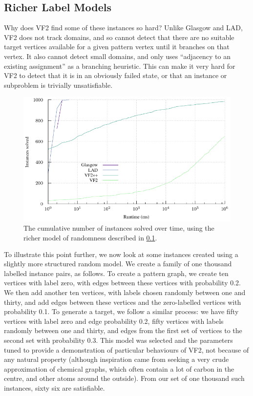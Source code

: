 \documentclass[twoside,11pt]{article}
\begin{document}
\subsection{Richer Label Models}\label{subsection:richer-labels}

Why does VF2 find some of these instances so hard? Unlike Glasgow and LAD, VF2 does not track
domains, and so cannot detect that there are no suitable target vertices available for a given
pattern vertex until it branches on that vertex.  It also cannot detect small domains, and only uses
``adjacency to an existing assignment'' as a branching heuristic. This can make it very hard for VF2
to detect that it is in an obviously failed state, or that an instance or subproblem is trivially
unsatisfiable.

\begin{figure}[t]
    \centering
    \includegraphics*{plots/skewed.pdf}

    \caption{The cumulative number of instances solved over time, using the richer model of
    randomness described in \cref{subsection:richer-labels}.}
    \label{figure:skewed-cumulative}
\end{figure}

To illustrate this point further, we now look at some instances created using a slightly more
structured random model. We create a family of one thousand labelled instance pairs, as follows. To
create a pattern graph, we create ten vertices with label zero, with edges between these vertices
with probability 0.2. We then add another ten vertices, with labels chosen randomly between one and
thirty, and add edges between these vertices and the zero-labelled vertices with probability 0.1.
To generate a target, we follow a similar process: we have fifty vertices with label zero and edge
probability 0.2, fifty vertices with labels randomly between one and thirty, and edges from the
first set of vertices to the second set with probability 0.3.  This model was selected and the
parameters tuned to provide a demonstration of particular behaviours of VF2, not because of any natural
property (although inspiration came from seeking a very crude approximation of chemical graphs,
which often contain a lot of carbon in the centre, and other atoms around the outside). From our set
of one thousand such instances, sixty six are satisfiable.
\end{document}
